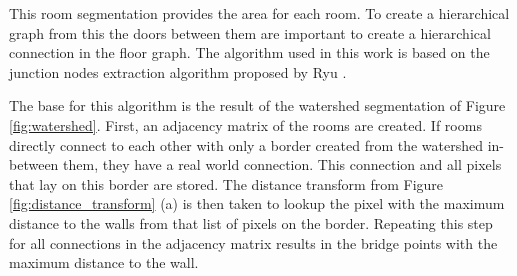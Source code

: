 This room segmentation provides the area for each room. To create a hierarchical graph from this the doors between them are important to create a hierarchical connection in the floor graph. The algorithm used in this work is based on the junction nodes extraction algorithm proposed by Ryu \cite{ryu_hierarchical_2020}. 


The base for this algorithm is the result of the watershed segmentation of Figure \ref{fig:watershed}. First, an adjacency matrix of the rooms are created. If rooms directly connect to each other with only a border created from the watershed in-between them, they have a real world connection. This connection and all pixels that lay on this border are stored. The distance transform from Figure \ref{fig:distance_transform} (a) is then taken to lookup the pixel with the maximum distance to the walls from that list of pixels on the border. Repeating this step for all connections in the adjacency matrix results in the bridge points with the maximum distance to the wall. 

